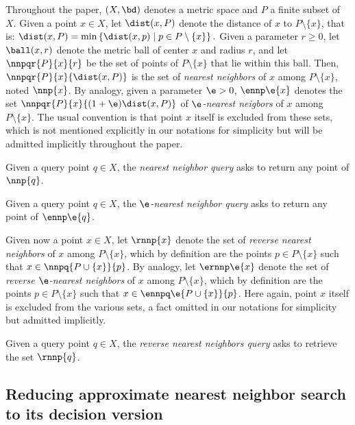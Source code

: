 Throughout the paper, $(X,\bd)$ denotes a metric space and $P$ a
finite subset of $X$.  Given a point $x\in X$, let $\dist(x,P)$ denote
the distance of $x$ to $P\setminus\{x\}$, that is: $\dist(x,P) = \min
\left\{\dist(x,p) \mid p\in P\setminus\{x\}\right\}.$ Given a
parameter $r\geq 0$, let $\ball(x,r)$ denote the metric ball of
center $x$ and radius $r$, and let $\nnpqr{P}{x}{r}$ be the set of
points of $P\setminus\{x\}$ that lie within this ball.  Then,
$\nnpqr{P}{x}{\dist(x,P)}$ is the set of {\em nearest neighbors} of
$x$ among $P\setminus\{x\}$, noted $\nnp{x}$. By analogy, given a
parameter $\e> 0$, $\ennp\e{x}$ denotes the set
$\nnpqr{P}{x}{(1+\e)\dist(x,P)}$ of {\em $\e$-nearest neigbors} of $x$
among $P\setminus\{x\}$. The usual convention is that point $x$ itself
is excluded from these sets, which is not mentioned explicitly in our
notations for simplicity but will be admitted implicitly throughout the paper.
\begin{problem}[\nn] \label{problem:nn}
  Given a query point $q\in X$, the {\em nearest neighbor query} asks
  to return any point of $\nnp{q}$.
\end{problem}
\begin{problem}[$\e$-\nn] \label{problem:enn}
  Given a query point $q\in X$, the {\em $\e$-nearest neighbor query}
  asks to return any point of $\ennp\e{q}$.
\end{problem}
Given now a point $x\in X$, let $\rnnp{x}$ denote the set of {\em
  reverse nearest neighbors} of $x$ among $P\setminus\{x\}$, which by
definition are the points $p\in P\setminus\{x\}$ such that $x\in
\nnpq{P\cup\{x\}}{p}$. By analogy, let $\ernnp\e{x}$ denote the set of
     {\em reverse $\e$-nearest neighbors} of $x$ among
     $P\setminus\{x\}$, which by definition are the points $p\in
     P\setminus\{x\}$ such that $x\in \ennpq\e{P\cup\{x\}}{p}$. Here
     again, point $x$ itself is excluded from the various sets, a fact
     omitted in our notations for simplicity but admitted
     implicitly.
\begin{problem}[\rnn] \label{problem:rnn}
  Given a query point $q\in X$, the {\em reverse nearest neighbors
    query} asks to retrieve the set $\rnnp{q}$.
\end{problem}



\subsection{Reducing approximate nearest neighbor search to its decision version}
\label{sec:renn-to-enn}

